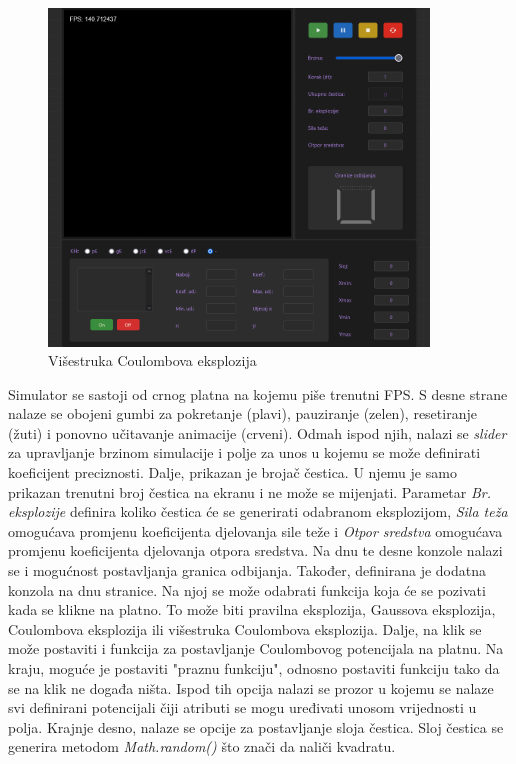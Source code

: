 \documentclass{foi}
\begin{document}
\begin{figure}[H]
    \centering
    \includegraphics[width=0.9\textwidth]{slike/21_Simulator.png}
    \captionsetup{justification=centering}
    \caption{Višestruka Coulombova eksplozija}
\label{fig:Simulator}
\end{figure}

Simulator se sastoji od crnog platna na kojemu piše trenutni FPS. S desne strane nalaze se obojeni gumbi za pokretanje (plavi), pauziranje (zelen), resetiranje (žuti) i ponovno učitavanje animacije (crveni). Odmah ispod njih, nalazi se \textit{slider} za upravljanje brzinom simulacije i polje za unos u kojemu se može definirati koeficijent preciznosti. Dalje, prikazan je brojač čestica. U njemu je samo prikazan trenutni broj čestica na ekranu i ne može se mijenjati. Parametar \textit{Br. eksplozije} definira koliko čestica će se generirati odabranom eksplozijom, \textit{Sila teža} omogućava promjenu koeficijenta djelovanja sile teže i \textit{Otpor sredstva} omogućava promjenu koeficijenta djelovanja otpora sredstva. Na dnu te desne konzole nalazi se i mogućnost postavljanja granica odbijanja. Također, definirana je dodatna konzola na dnu stranice. Na njoj se može odabrati funkcija koja će se pozivati kada se klikne na platno. To može biti pravilna eksplozija, Gaussova eksplozija, Coulombova eksplozija ili višestruka Coulombova eksplozija. Dalje, na klik se može postaviti i funkcija za postavljanje Coulombovog potencijala na platnu. Na kraju, moguće je postaviti "praznu funkciju", odnosno postaviti funkciju tako da se na klik ne događa ništa. Ispod tih opcija nalazi se prozor u kojemu se nalaze svi definirani potencijali čiji atributi se mogu uređivati unosom vrijednosti u polja. Krajnje desno, nalaze se opcije za postavljanje sloja čestica. Sloj čestica se generira metodom \textit{Math.random()} što znači da naliči kvadratu. 
\end{document}
